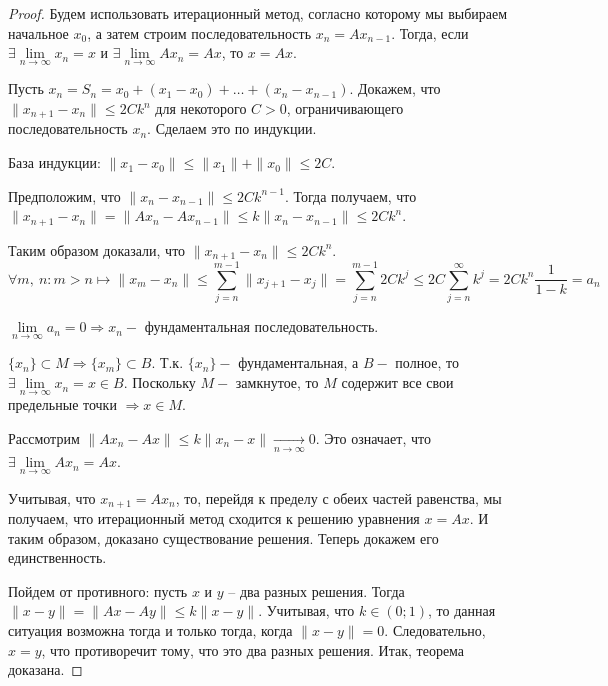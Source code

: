 \begin{proof}
    Будем использовать итерационный метод, согласно которому мы выбираем начальное $x_0$, а затем строим последовательность $x_n = Ax_{n-1}$. Тогда, если $\exists \lim\limits_{n \rightarrow \infty} x_n = x$ и $\exists \lim\limits_{n \rightarrow \infty} Ax_n = Ax$, то $x = Ax$.
    
        Пусть $x_n = S_n = x_0 + (x_1 - x_0) + \ldots + (x_n - x_{n-1})$.
        Докажем, что $\|x_{n+1} - x_n\| \leqslant 2Ck^n$ для некоторого $C > 0$, ограничивающего последовательность $x_n$. Сделаем это по индукции.
        
        База индукции: $\|x_1 - x_0\| \leqslant \|x_1\| + \|x_0\| \leqslant 2C$.
        
        Предположим, что $\|x_n - x_{n-1}\| \leqslant 2Ck^{n-1}$. Тогда получаем, что $\|x_{n+1} - x_n\| = \|Ax_n - Ax_{n-1}\| \leqslant k \|x_n - x_{n-1}\| \leqslant 2Ck^n$.
        
        Таким образом доказали, что $ \|x_{n+1} - x_n\| \leqslant 2Ck^n $.
         $$\forall m,~ n: m > n \longmapsto \|x_m - x_n\| \leqslant \sum\limits_{j = n}^{m-1} {\|x_{j + 1} - x_j\|} = \sum\limits_{j = n}^{m-1} {2Ck^j} \leqslant 2C\sum\limits_{j = n}^{\infty} {k^j} = 2Ck^n \frac{1}{1 - k} = a_n$$
        
    $\lim\limits_{n \to \infty}{a_n} = 0 \Rightarrow x_n - $ фундаментальная последовательность.
    
    $\{x_n\} \subset M \Rightarrow \{x_m\} \subset B$. Т.к. $\{x_n\} - $ фундаментальная, а $B - $ полное, то $\exists \lim\limits_{n \rightarrow \infty} x_n = x \in B$. Поскольку $M - $ замкнутое, то $M$ содержит все свои предельные точки $\Rightarrow x \in M$.
        
        Рассмотрим $\|Ax_n - Ax\| \leqslant k\|x_n - x\| \underset{n \rightarrow \infty}{\longrightarrow} 0$. Это означает, что $\exists \lim\limits_{n \rightarrow \infty} Ax_n = Ax$. 
        
        Учитывая, что $x_{n+1} = Ax_n$, то, перейдя к пределу с обеих частей равенства, мы получаем, что итерационный метод сходится к решению уравнения $x = Ax$. И таким образом, доказано существование решения. Теперь докажем его единственность.
        
        Пойдем от противного: пусть $x$ и $y$ -- два разных решения. Тогда $\|x - y\| = \|Ax - Ay\| \leqslant k \|x - y\|$. Учитывая, что $k \in (0; 1)$, то данная ситуация возможна тогда и только тогда, когда $\|x - y\| = 0$. Следовательно, $x = y$, что противоречит тому, что это два разных решения. Итак, теорема доказана.
\end{proof}
